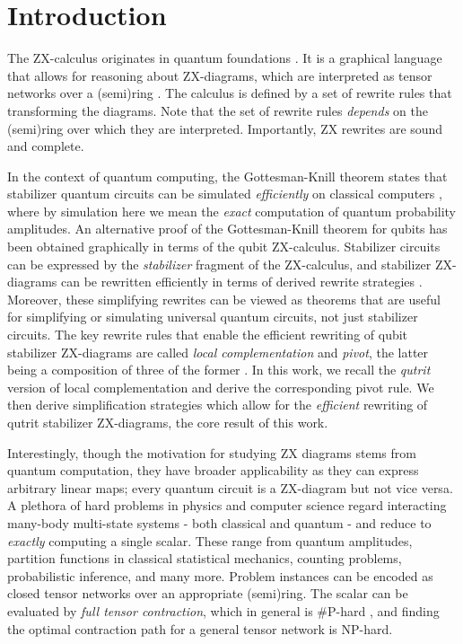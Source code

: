 \section{Introduction}



The ZX-calculus originates in
quantum foundations \cite{Coecke2011,vandewetering2020zxcalculus}.
It is a graphical language that allows for reasoning about ZX-diagrams,
which are interpreted as tensor networks over
a (semi)ring \cite{wang2020completeness}.
The calculus
is defined by a set of rewrite rules
that transforming the diagrams.
Note that the set of rewrite rules \emph{depends} on
the (semi)ring over which they are interpreted.
Importantly, ZX rewrites are sound and complete.


In the context of quantum computing,
the Gottesman-Knill theorem states that stabilizer quantum
circuits can be
simulated \emph{efficiently} on classical computers \cite{Aaronson2004},
where by simulation here we mean the \emph{exact} computation of quantum probability amplitudes.
An alternative
proof of the Gottesman-Knill theorem for qubits has been obtained graphically in terms of the qubit ZX-calculus.
Stabilizer circuits can be expressed by the \emph{stabilizer}
fragment of the ZX-calculus,
and stabilizer ZX-diagrams can be rewritten efficiently
in terms of derived rewrite strategies \cite{graph_theoretic_simplification}.
Moreover, these simplifying rewrites can be viewed as theorems
that are useful for simplifying or simulating universal quantum circuits, not just stabilizer circuits.
The key rewrite rules that enable the efficient rewriting
of qubit stabilizer ZX-diagrams
are called \emph{local complementation} and \emph{pivot},
the latter being a composition of three of the former \cite{graph_theoretic_simplification}.
In this work, we recall the \emph{qutrit} version of local complementation \cite{harny_completeness} and derive the corresponding pivot rule.
We then derive simplification strategies
which allow for the \emph{efficient} rewriting of qutrit stabilizer ZX-diagrams,
the core result of this work.

Interestingly, though the motivation for studying ZX diagrams stems from quantum computation, they have broader applicability as they
can express arbitrary linear maps;
every quantum circuit is a ZX-diagram but not vice versa.
A plethora of hard problems in physics and computer science
regard interacting many-body multi-state systems - both classical and quantum -
and reduce to \emph{exactly} computing a single scalar.
These range from quantum amplitudes,
partition functions in classical statistical mechanics,
counting problems, probabilistic inference, and many more.
Problem instances can be encoded as closed
tensor networks over an appropriate (semi)ring.
The scalar can be evaluated by \emph{full tensor contraction},
which in general is \#P-hard \cite{Damm2002},
and finding the optimal contraction path for a general tensor network is NP-hard.


